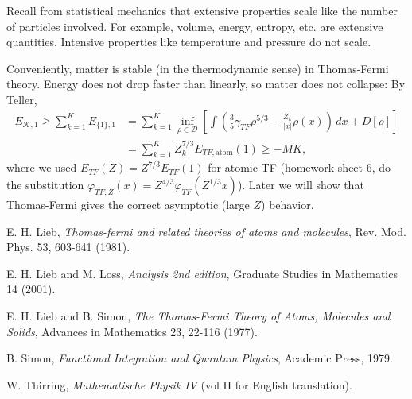 \documentclass[11pt]{amsart}
\theoremstyle{definition}
\theoremstyle{definition}
\theoremstyle{definition}
\numberwithin{equation}{section}
\begin{document}
Recall from statistical mechanics that extensive properties scale like the number of particles involved. For example, volume, energy, entropy, etc. are extensive quantities. Intensive properties like temperature and pressure do not scale.

Conveniently, matter is stable (in the thermodynamic sense) in Thomas-Fermi theory. Energy does not drop faster than linearly, so matter does not collapse: By Teller,
\begin{align*}
E_{\mathcal{K},1}\ge\sum_{k=1}^KE_{\{1\},1}&=\sum_{k=1}^K\inf_{\rho\in\mathcal{D}}\left[\int\left(\frac{3}{5}\gamma_{TF}\rho^{5/3}-\frac{Z_k}{|x|}\rho(x)\right)\,dx+D[\rho]\right]\\
&=\sum_{k=1}^K Z_k^{7/3}E_{TF,\text{atom}}(1)\ge -MK,
\end{align*}
where we used $E_{TF}(Z)=Z^{7/3}E_{TF}(1)$ for atomic TF (homework sheet 6, do the substitution $\varphi_{TF,Z}(x)=Z^{4/3}\varphi_{TF}(Z^{1/3}x)$).
Later we will show that Thomas-Fermi gives the correct asymptotic (large $Z$) behavior.






\begin{thebibliography}{99}
 E. H. Lieb, \textit{Thomas-fermi and related theories of atoms and molecules}, Rev. Mod. Phys. 53, 603-641 (1981).

 E. H. Lieb and M. Loss, \textit{Analysis 2nd edition}, Graduate Studies in Mathematics 14 (2001).

 E. H. Lieb and B. Simon, \textit{The Thomas-Fermi Theory of Atoms, Molecules and Solids}, Advances in Mathematics 23, 22-116 (1977).

 B. Simon, \textit{Functional Integration and Quantum Physics}, Academic Press, 1979.

 W. Thirring, \textit{Mathematische Physik IV} (vol II for English translation).
\end{thebibliography}
\end{document}
